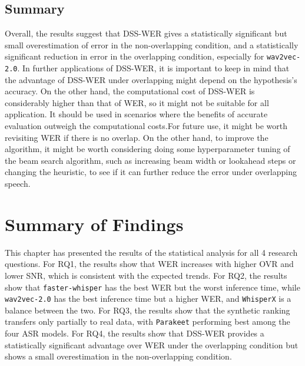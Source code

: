 \subsection{Summary}
Overall, the results suggest that DSS-WER gives a statistically significant but small overestimation of error in the non-overlapping condition, and a statistically significant reduction in error in the overlapping condition, especially for \texttt{wav2vec-2.0}. In further applications of DSS-WER, it is important to keep in mind that the advantage of DSS-WER under overlapping might depend on the hypothesis's accuracy. On the other hand, the computational cost of DSS-WER is considerably higher than that of WER, so it might not be suitable for all application. It should be used in scenarios where the benefits of accurate evaluation outweigh the computational costs.For future use, it might be worth revisiting WER if there is no overlap. On the other hand, to improve the algorithm, it might be worth considering doing some hyperparameter tuning of the beam search algorithm, such as increasing beam width or lookahead steps or changing the heuristic, to see if it can further reduce the error under overlapping speech. 

\section{Summary of Findings}
\label{sec:rq_summary_of_findings}
This chapter has presented the results of the statistical analysis for all 4 research questions. For RQ1, the results show that WER increases with higher OVR and lower SNR, which is consistent with the expected trends. For RQ2, the results show that \texttt{faster-whisper} has the best WER but the worst inference time, while \texttt{wav2vec-2.0} has the best inference time but a higher WER, and \texttt{WhisperX} is a balance between the two. For RQ3, the results show that the synthetic ranking transfers only partially to real data, with \texttt{Parakeet} performing best among the four ASR models. For RQ4, the results show that DSS-WER provides a statistically significant advantage over WER under the overlapping condition but shows a small overestimation in the non-overlapping condition.
